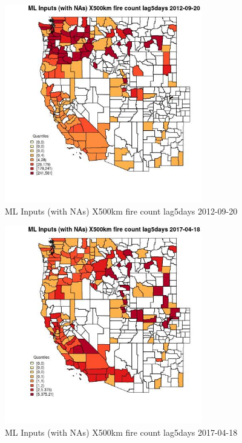 \begin{figure} 
\centering  
\includegraphics[width=0.77\textwidth]{Code_Outputs/Report_ML_input_PM25_Step4_part_e_de_duplicated_aves_compiled_2019-05-14wNAs_CountyX500km_fire_count_lag5daysMean2012-09-20_2012-09-20.jpg} 
\caption{\label{fig:Report_ML_input_PM25_Step4_part_e_de_duplicated_aves_compiled_2019-05-14wNAsCountyX500km_fire_count_lag5daysMean2012-09-20_2012-09-20}ML Inputs (with NAs) X500km fire count lag5days 2012-09-20} 
\end{figure} 
 

\begin{figure} 
\centering  
\includegraphics[width=0.77\textwidth]{Code_Outputs/Report_ML_input_PM25_Step4_part_e_de_duplicated_aves_compiled_2019-05-14wNAs_CountyX500km_fire_count_lag5daysMean2017-04-18_2017-04-18.jpg} 
\caption{\label{fig:Report_ML_input_PM25_Step4_part_e_de_duplicated_aves_compiled_2019-05-14wNAsCountyX500km_fire_count_lag5daysMean2017-04-18_2017-04-18}ML Inputs (with NAs) X500km fire count lag5days 2017-04-18} 
\end{figure} 
 


